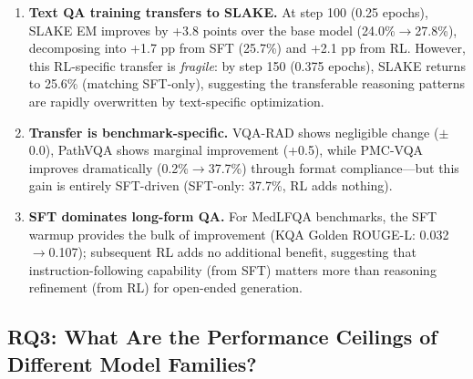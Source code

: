 \documentclass{article}
\begin{document}
\begin{enumerate}[nosep, leftmargin=*]
    \item \textbf{Text QA training transfers to SLAKE.} At step 100 (0.25 epochs), SLAKE EM improves by +3.8 points over the base model (24.0\%$\to$27.8\%), decomposing into +1.7 pp from SFT (25.7\%) and +2.1 pp from RL. However, this RL-specific transfer is \emph{fragile}: by step 150 (0.375 epochs), SLAKE returns to 25.6\% (matching SFT-only), suggesting the transferable reasoning patterns are rapidly overwritten by text-specific optimization.
    \item \textbf{Transfer is benchmark-specific.} VQA-RAD shows negligible change ($\pm$0.0), PathVQA shows marginal improvement (+0.5), while PMC-VQA improves dramatically (0.2\%$\to$37.7\%) through format compliance---but this gain is entirely SFT-driven (SFT-only: 37.7\%, RL adds nothing).
    \item \textbf{SFT dominates long-form QA.} For MedLFQA benchmarks, the SFT warmup provides the bulk of improvement (KQA Golden ROUGE-L: 0.032$\to$0.107); subsequent RL adds no additional benefit, suggesting that instruction-following capability (from SFT) matters more than reasoning refinement (from RL) for open-ended generation.
\end{enumerate}


\subsection{RQ3: What Are the Performance Ceilings of Different Model Families?}
\label{sec:ceiling}
\end{document}
